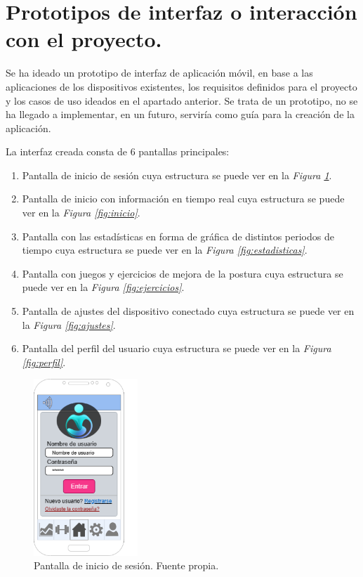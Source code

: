 \clearpage

\section{Prototipos de interfaz o interacción con el proyecto.}

Se ha ideado un prototipo de interfaz de aplicación móvil, en base a las aplicaciones de los dispositivos existentes, los requisitos definidos para el proyecto y los casos de uso ideados en el apartado anterior. Se trata de un prototipo, no se ha llegado a implementar, en un futuro, serviría como guía para la creación de la aplicación.

La interfaz creada consta de 6 pantallas principales:
\begin{enumerate}
    \item Pantalla de inicio de sesión cuya estructura se puede ver en la \textit{Figura \ref{fig:inicioSesion}}.
    \item Pantalla de inicio con información en tiempo real cuya estructura se puede ver en la \textit{Figura \ref{fig:inicio}}.
    \item Pantalla con las estadísticas en forma de gráfica de distintos periodos de tiempo cuya estructura se puede ver en la \textit{Figura \ref{fig:estadisticas}}.
    \item Pantalla con juegos y ejercicios de mejora de la postura cuya estructura se puede ver en la \textit{Figura \ref{fig:ejercicios}}.
    \item Pantalla de ajustes del dispositivo conectado cuya estructura se puede ver en la \textit{Figura \ref{fig:ajustes}}.
    \item Pantalla del perfil del usuario cuya estructura se puede ver en la \textit{Figura \ref{fig:perfil}}.
\end{enumerate}


\begin{figure}[h]
    \centering
    \includegraphics[width=0.35\textwidth]{img/InicioSesion.png}
    \caption{Pantalla de inicio de sesión. Fuente propia.}
    \label{fig:inicioSesion} 
\end{figure}

